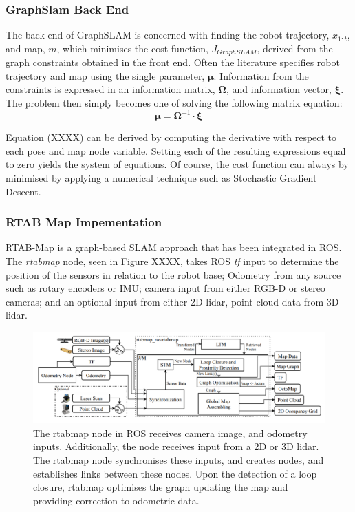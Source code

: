\documentclass[a4paper]{article}
\begin{document}
\subsubsection{GraphSlam Back End}
The back end of GraphSLAM is concerned with finding the robot trajectory, $x_{1:t}$, and map, $m$, which minimises the cost function, $J_{GraphSLAM}$, derived from the graph constraints obtained in the front end. Often the literature specifies robot trajectory and map using the single parameter, $\boldsymbol{\mu}$. Information from the constraints is expressed in an information matrix, $\boldsymbol{\Omega}$, and information vector, $\boldsymbol{\xi}$. The problem then simply becomes one of solving the following matrix equation:
\begin{equation}
\boldsymbol{\mu} = \boldsymbol{\Omega}^{-1} \cdot \boldsymbol{\xi}
\end{equation}

Equation (XXXX) can be derived by computing the derivative with respect to each pose and map node variable. Setting each of the resulting expressions equal to zero yields the system of equations. Of course, the cost function can always by minimised by applying a numerical technique such as Stochastic Gradient Descent.


\subsubsection{RTAB Map Impementation}
RTAB-Map is a graph-based SLAM approach that has been integrated in ROS. The \textit{rtabmap} node, seen in Figure XXXX, takes ROS \textit{tf} input to determine the position of the sensors in relation to the robot base; Odometry from any source such as rotary encoders or IMU; camera input from either RGB-D or stereo cameras; and an optional input from either 2D lidar, point cloud data from 3D lidar.
\begin{figure}[h]
\centering
\includegraphics[scale=0.3]{rtabmap_node}
\caption{The rtabmap node in ROS receives camera image, and odometry inputs. Additionally, the node receives input from a 2D or 3D lidar. The rtabmap node synchronises these inputs, and creates nodes, and establishes links between these nodes. Upon the detection of a loop closure, rtabmap optimises the graph updating the map and providing correction to odometric data.}
\end{figure}
\end{document}
